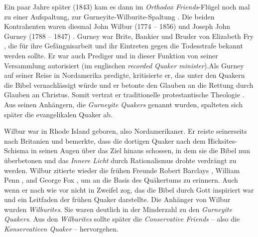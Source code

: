 Ein paar Jahre später (1843) kam es dann im \textit{Orthodox Friends}-Flügel
noch mal zu einer Aufspaltung, zur Gurneyite-Wilburite-Spaltung
. Die beiden
Kontrahenten waren diesmal John Wilbur (1774 -- 1856)  und Joseph John Gurney
(1788 -- 1847) . Gurney war Brite, Bankier
 und Bruder von Elizabeth Fry , die für
ihre Gefängnisarbeit  und ihr Eintreten gegen
die Todesstrafe  bekannt werden
sollte. Er war auch Prediger  und in dieser Funktion
von seiner
Versammlung autorisiert (im englischen \textit{recorded Quaker minister}).Als
Gurney auf seiner Reise in Nordamerika predigte, kritisierte er, das unter den
Quakern die Bibel  vernachlässigt würde und er betonte den Glauben
an die
Rettung durch Glauben an Christus. Somit vertrat er traditionelle
protestantische Theologie . Aus seinen
Anhängern, die \textit{Gurneyite Quakers}
genannt wurden, spalteten sich später die evangelikalen Quaker
 ab.

\medskip

Wilbur war in Rhode Island  geboren, also
Nordamerikaner. Er reiste seinerseits
nach Britanien und bemerkte, dass die dortigen Quaker nach dem Hicksites-Schisma
in seinen Augen über das Ziel hinaus schossen, in dem sie die Bibel nun
überbetonen und das \textit{Innere Licht} durch Rationalismus drohte verdrängt
zu werden. Wilbur zitierte wieder die frühen Freunde Robert Barclays
, William
Penn , and George Fox , um an die Basis des Quäkertums zu erinnern. Auch wenn er
nach wie vor nicht in Zweifel zog, das die Bibel durch Gott inspiriert war und
ein Leitfaden der frühen Quaker darstellte. Die Anhänger von Wilbur wurden
\textit{Wilburites}. Sie waren deutlich in der Minderzahl zu den
\textit{Gurneyite Quakers}. Aus den \textit{Wilburites} sollte später die
\textit{Conservative Friends}  -- also die
\textit{Konservativen Quaker} --
hervorgehen.

\medskip

